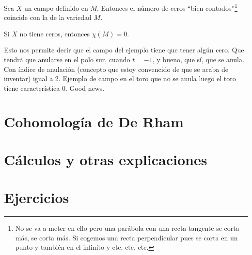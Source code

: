 \documentclass[palatino, bibnumbers]{apuntes}
\begin{document}
\begin{theorem} Sea $X$ un campo definido en $M$. Entonces el número de ceros ``bien contados''\footnote{No se va a meter en ello pero una parábola con una recta tangente se corta más, se corta más. Si cogemos una recta perpendicular pues se corta en un punto y también en el infinito y etc, etc, etc.} coincide con la  de la variedad $M$.

\end{theorem}

\begin{corol} Si $X$ no tiene ceros, entonces $χ(M) = 0$.
\end{corol}

Esto nos permite decir que el campo del ejemplo tiene que tener algún cero. Que tendrá que anularse en el polo sur, cuando $t = -1$, y bueno, que sí, que se anula. Con índice de anulación (concepto que estoy convencido de que se acaba de inventar) igual a 2. Ejemplo de campo en el toro que no se anula luego el toro tiene característica 0. Good news.

\chapter{Cohomología de De Rham}
\label{chap:CohomologiaDeRham}

\appendix

\chapter{Cálculos y otras explicaciones}


\chapter{Ejercicios}


{}
\printindex
\end{document}
